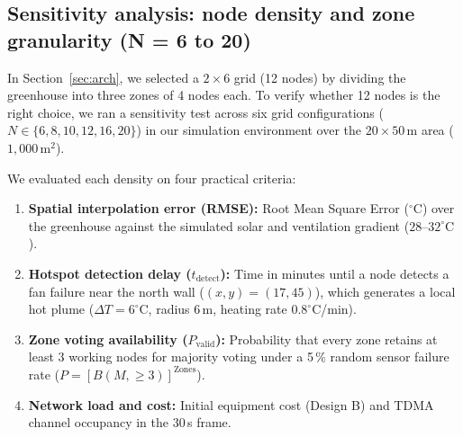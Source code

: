 \documentclass[11pt,a4paper]{report}
\begin{document}
\subsection{Sensitivity analysis: node density and zone granularity (N = 6 to 20)}\label{sec:nodesens}
In Section~\ref{sec:arch}, we selected a $2\times6$ grid (12 nodes) by dividing the greenhouse into three zones of 4 nodes each. To verify whether 12 nodes is the right choice, we ran a sensitivity test across six grid configurations ($N \in \{6, 8, 10, 12, 16, 20\}$) in our simulation environment over the $20\times50$\,m area ($1{,}000\,\text{m}^2$). 

We evaluated each density on four practical criteria:
\begin{enumerate}[noitemsep]
  \item \textbf{Spatial interpolation error (RMSE):} Root Mean Square Error ($^\circ\text{C}$) over the greenhouse against the simulated solar and ventilation gradient ($28$--$32^\circ\text{C}$).
  \item \textbf{Hotspot detection delay ($t_{\text{detect}}$):} Time in minutes until a node detects a fan failure near the north wall ($(x, y) = (17, 45)$), which generates a local hot plume ($\Delta T = 6^\circ\text{C}$, radius $6$\,m, heating rate $0.8^\circ\text{C}$/min).
  \item \textbf{Zone voting availability ($P_{\text{valid}}$):} Probability that every zone retains at least 3 working nodes for majority voting under a 5\,\% random sensor failure rate ($P = [B(M, \geq 3)]^{\text{Zones}}$).
  \item \textbf{Network load and cost:} Initial equipment cost (Design B) and TDMA channel occupancy in the 30\,s frame.
\end{enumerate}
\end{document}

